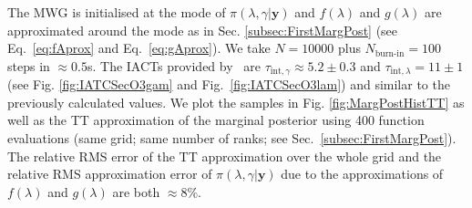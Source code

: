 The MWG is initialised at the mode of $\pi(\lambda,\gamma| \bm{y})$ and $f(\lambda)$ and $g(\lambda)$ are approximated around the mode as in Sec. \ref{subsec:FirstMargPost} (see Eq.~\ref{eq:fAprox} and Eq.~\ref{eq:gAprox}).
We take $N = 10000$ plus $N_{\text{burn-in}} = 100$ steps in $\approx 0.5$s.
The IACTs provided by~\cite{drikHesse} are $\tau_{\text{int}, \gamma} \approx 5.2 \pm 0.3$ and $\tau_{\text{int}, \lambda} = 11 \pm 1 $ (see Fig. \ref{fig:IATCSecO3gam} and Fig.~\ref{fig:IATCSecO3lam}) and similar to the previously calculated values.
We plot the samples in Fig. \ref{fig:MargPostHistTT} as well as the TT approximation of the marginal posterior using 400 function evaluations (same grid; same number of ranks; see Sec.~\ref{subsec:FirstMargPost}).
The relative RMS error of the TT approximation over the whole grid and the relative RMS approximation error of $\pi(\lambda,\gamma| \bm{y})$ due to the approximations of $f(\lambda)$ and $g(\lambda)$ are both $\approx 8 \%$.


